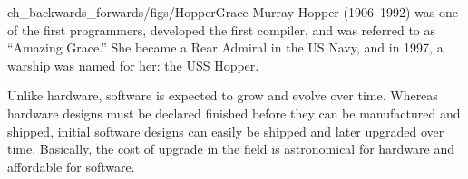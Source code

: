 %

\begin{sidebargraphic}[-1in]{ch_backwards_forwards/figs/Hopper}{Grace Murray Hopper}
	(1906--1992)
	was one of the first programmers, developed the first compiler, and was referred to as ``Amazing Grace.'' She became a Rear Admiral in the US Navy, and in 1997, a warship was named for her: the USS Hopper.
\end{sidebargraphic}




Unlike hardware, software is expected to grow and evolve over time. Whereas hardware designs must be
declared finished before they can be manufactured and shipped, initial software designs can easily be shipped and later upgraded over time. Basically, the cost of upgrade in the field is astronomical for hardware and affordable for software.
